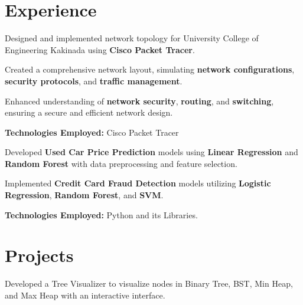 \documentclass[]{deedy-resume-openfont}
\begin{document}
\begin{minipage}[t]{0.66\textwidth} 


\section{Experience}

\vspace{\topsep} %
\begin{tightemize}
\item 
    \item Designed and implemented network topology for University College of Engineering Kakinada using \textbf{Cisco Packet Tracer}.
    \item Created a comprehensive network layout, simulating \textbf{network configurations}, \textbf{security protocols}, and \textbf{traffic management}.
    \item Enhanced understanding of \textbf{network security}, \textbf{routing}, and \textbf{switching}, ensuring a secure and efficient network design. 
\item \textbf{Technologies Employed:} Cisco Packet Tracer
\end{tightemize}
\sectionsep

\begin{tightemize}
    \item Developed \textbf{Used Car Price Prediction} models using \textbf{Linear Regression} and \textbf{Random Forest} with data preprocessing and feature selection.
    \item Implemented \textbf{Credit Card Fraud Detection} models utilizing \textbf{Logistic Regression}, \textbf{Random Forest}, and \textbf{SVM}. 
\item \textbf{Technologies Employed:} Python and its Libraries.
\end{tightemize}
\sectionsep



\section{Projects}
\begin{normalsize} %
\begin{tightemize}
    \item Developed a Tree Visualizer to visualize nodes in Binary Tree, BST, Min Heap, and Max Heap with an interactive interface.
   

\end{tightemize}
\end{normalsize}
\end{minipage}
\end{document}
